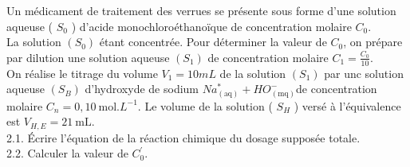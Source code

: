 Un médicament de traitement des verrues se présente sous forme d'une solution aqueuse ( $S_{0}$ ) d'acide monochloroéthanoïque de concentration molaire $C_{0}$.\\
La solution $\left(S_{0}\right)$ étant concentrée. Pour déterminer la valeur de $C_{0}$, on prépare par dilution une solution aqueuse $\left(S_{1}\right)$ de concentration molaire $C_{1}=\frac{C_{0}}{10}$.\\
On réalise le titrage du volume $V_{1}=10 m L$ de la solution $\left(S_{1}\right)$ par unc solution aqueuse $\left(S_{B}\right)$ d'hydroxyde de sodium $N a_{(\mathrm{aq})}^{*}+H O_{(\mathrm{mq})}^{-}$de concentration molaire $C_{n}=0,10 \mathrm{~mol} . L^{-1}$. Le volume de la solution ( $S_{H}$ ) versé à l'équivalence est $V_{H, E}=21 \mathrm{~mL}$.\\
2.1. Écrire l'équation de la réaction chimique du dosage supposée totale.\\
2.2. Calculer la valeur de $C_{0}^{\prime}$.


